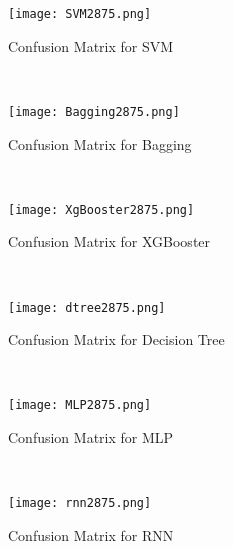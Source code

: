 \documentclass[12pt, English]{article}
\begin{document}
\begin{normalsize}
\begin{figure}
\begin{center}
\texttt{[image: SVM2875.png]}
\end{center}
\begin{center}
\renewcommand{\thefigure}{5.1}
\caption{\footnotesize Confusion Matrix for SVM }
\end{center}
\\
\begin{center}
\texttt{[image: Bagging2875.png]}
\end{center}
\begin{center}
\renewcommand{\thefigure}{5.2}
\caption{\footnotesize Confusion Matrix for Bagging }
\end{center}
\end{figure}
\\
\begin{figure}
\begin{center}
\texttt{[image: XgBooster2875.png]}
\end{center}
\begin{center}
\renewcommand{\thefigure}{5.3}
\caption{\footnotesize Confusion Matrix for XGBooster }
\end{center}
\\
\begin{center}
\texttt{[image: dtree2875.png]}
\end{center}
\begin{center}
\renewcommand{\thefigure}{5.4}
\caption{\footnotesize Confusion Matrix for Decision Tree }
\end{center}
\end{figure}
\\
\begin{figure}
\begin{center}
\texttt{[image: MLP2875.png]}
\end{center}
\begin{center}
\renewcommand{\thefigure}{5.5}
\caption{\footnotesize Confusion Matrix for MLP }
\end{center}
\\
\begin{center}
\texttt{[image: rnn2875.png]}
\end{center}
\begin{center}
\renewcommand{\thefigure}{5.6}
\caption{\footnotesize Confusion Matrix for RNN }
\end{center}
\end{figure}

\end{normalsize}
\end{document}

